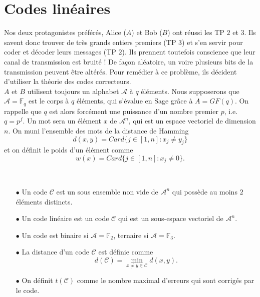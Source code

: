 \section{Codes linéaires}


Nos deux protagonistes préférés, Alice ($A$) et Bob ($B$) ont réussi les TP $2$ et $3$. Ils savent donc trouver de très grands entiers premiers (TP $3$) et s'en servir pour coder et décoder leurs messages (TP $2$). Ils prennent toutefois conscience que leur canal de transmission est bruité ! De façon aléatoire, un voire plusieurs bits de la transmission peuvent être altérés. Pour remédier à ce problème, ils décident d'utiliser la théorie des codes correcteurs.\\

$A$ et $B$ utilisent toujours un alphabet $\mathcal A$ à $q$ éléments. Nous supposerons que $\mathcal A = \mathbb F_q $ est le corps à $q$ éléments, qui s'évalue en Sage grâce à $A=GF(q)$. On rappelle que $q$ est alors forcément une puissance d'un nombre premier $p$, i.e. $q=p^f$. Un mot sera un élément $x$ de $\mathcal A^n$, qui est un espace vectoriel de dimension $n$. On muni l'ensemble des mots de la distance de Hamming
\[d(x,y)=Card \{j\in [1,n] : x_j\neq y_j\}\]
et on définit le poids d'un élément comme
\[w(x)=Card \{j\in [1,n] : x_j\neq 0\}.\]
\begin{definition}\
\begin{itemize}
\item[$\bullet$] Un code $\mathcal C$ est un sous ensemble non vide de $\mathcal A^n$ qui possède au moins $2$ éléments distincts.
\item[$\bullet$] Un code linéaire est un code $\mathcal C$ qui est un sous-espace vectoriel de $\mathcal A ^n$.
\item[$\bullet$] Un code est binaire si $\mathcal A=\mathbb F_2$, ternaire si $\mathcal A = \mathbb F_3$.
\item[$\bullet$] La distance d'un code $\mathcal C$ est définie comme \[d(\mathcal C)=\min_{x\neq y \in \mathcal C} d(x,y).\]
\item[$\bullet$] On définit $t(\mathcal C)$ comme le nombre maximal d'erreurs qui sont corrigés par le code.
\end{itemize}
\end{definition}

